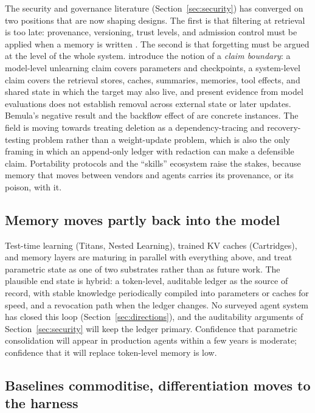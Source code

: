 \documentclass[11pt]{article}
\begin{document}
The security and governance literature (Section~\ref{sec:security}) has converged on two positions that are now shaping designs. The first is that filtering at retrieval is too late: provenance, versioning, trust levels, and admission control must be applied when a memory is written \citep{lin2026security,li2026memtx}. The second is that forgetting must be argued at the level of the whole system. \citet{xu2026unlearningsurvey} introduce the notion of a \emph{claim boundary}: a model-level unlearning claim covers parameters and checkpoints, a system-level claim covers the retrieval stores, caches, summaries, memories, tool effects, and shared state in which the target may also live, and present evidence from model evaluations does not establish removal across external state or later updates. Bemula's negative result and the backflow effect of \citet{wang2026unlearning} are concrete instances. The field is moving towards treating deletion as a dependency-tracing and recovery-testing problem rather than a weight-update problem, which is also the only framing in which an append-only ledger with redaction can make a defensible claim. Portability protocols \citep{ravindran2026portable} and the ``skills'' ecosystem raise the stakes, because memory that moves between vendors and agents carries its provenance, or its poison, with it.

\subsection{Memory moves partly back into the model}

Test-time learning (Titans, Nested Learning), trained KV caches (Cartridges), and memory layers are maturing in parallel with everything above, and \citet{huang2026secondhalf} treat parametric state as one of two substrates rather than as future work. The plausible end state is hybrid: a token-level, auditable ledger as the source of record, with stable knowledge periodically compiled into parameters or caches for speed, and a revocation path when the ledger changes. No surveyed agent system has closed this loop (Section~\ref{sec:directions}), and the auditability arguments of Section~\ref{sec:security} will keep the ledger primary. Confidence that parametric consolidation will appear in production agents within a few years is moderate; confidence that it will replace token-level memory is low.

\subsection{Baselines commoditise, differentiation moves to the harness}
\end{document}
